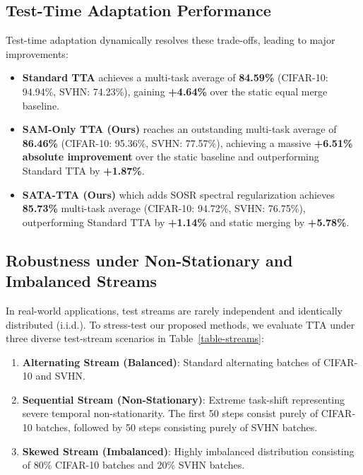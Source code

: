 \documentclass{article}
\theoremstyle{plain}
\theoremstyle{definition}
\theoremstyle{remark}
\begin{document}
\subsection{Test-Time Adaptation Performance}

Test-time adaptation dynamically resolves these trade-offs, leading to major improvements:
\begin{itemize}
  \item \textbf{Standard TTA} achieves a multi-task average of \textbf{84.59\%} (CIFAR-10: 94.94\%, SVHN: 74.23\%), gaining \textbf{+4.64\%} over the static equal merge baseline.
  \item \textbf{SAM-Only TTA (Ours)} reaches an outstanding multi-task average of \textbf{86.46\%} (CIFAR-10: 95.36\%, SVHN: 77.57\%), achieving a massive \textbf{+6.51\% absolute improvement} over the static baseline and outperforming Standard TTA by \textbf{+1.87\%}.
  \item \textbf{SATA-TTA (Ours)} which adds SOSR spectral regularization achieves \textbf{85.73\%} multi-task average (CIFAR-10: 94.72\%, SVHN: 76.75\%), outperforming Standard TTA by \textbf{+1.14\%} and static merging by \textbf{+5.78\%}.
\end{itemize}

\subsection{Robustness under Non-Stationary and Imbalanced Streams}
\label{submission-robustness}

In real-world applications, test streams are rarely independent and identically distributed (i.i.d.). To stress-test our proposed methods, we evaluate TTA under three diverse test-stream scenarios in Table~\ref{table-streams}:
\begin{enumerate}
  \item \textbf{Alternating Stream (Balanced)}: Standard alternating batches of CIFAR-10 and SVHN.
  \item \textbf{Sequential Stream (Non-Stationary)}: Extreme task-shift representing severe temporal non-stationarity. The first 50 steps consist purely of CIFAR-10 batches, followed by 50 steps consisting purely of SVHN batches.
  \item \textbf{Skewed Stream (Imbalanced)}: Highly imbalanced distribution consisting of 80\% CIFAR-10 batches and 20\% SVHN batches.
\end{enumerate}
\end{document}
